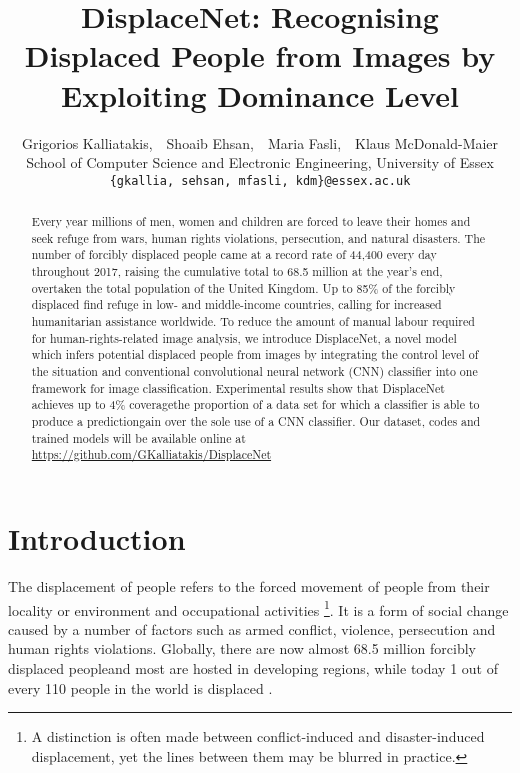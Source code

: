 \documentclass[10pt,twocolumn,letterpaper]{article}
\begin{document}
\title{DisplaceNet: Recognising Displaced People from Images by Exploiting Dominance Level}

\author{
	Grigorios Kalliatakis, \,\,
	Shoaib Ehsan, \,\,
	Maria Fasli, \,\,
	Klaus McDonald-Maier\vspace{3pt}\\
	School of Computer Science and Electronic Engineering, University of Essex\\
	{\tt\small \{gkallia, sehsan, mfasli, kdm\}@essex.ac.uk} 
}

\maketitle


\begin{abstract}
	Every year millions of men, women and children are forced to leave their homes and seek refuge from wars, human rights violations, persecution, and natural disasters. The number of forcibly displaced people came at a record rate of 44,400 every day throughout 2017, raising the cumulative total to 68.5 million at the year’s end, overtaken the total population of the United Kingdom. Up to 85\% of the forcibly displaced find refuge in low- and middle-income countries, calling for increased humanitarian assistance worldwide. To reduce the amount of manual labour required for human-rights-related image analysis, we introduce DisplaceNet, a novel model
	which infers potential displaced people from images by integrating the control level of the situation and conventional convolutional neural network (CNN) classifier into one framework for image classification. Experimental results show that DisplaceNet achieves up to 4\% coverage\textendash the proportion of a data set for which a classifier is able to produce a prediction\textendash gain over the sole use of a CNN classifier. Our dataset, codes and trained models will be available online at \url{https://github.com/GKalliatakis/DisplaceNet}
\end{abstract}

\section{Introduction}

The displacement of people refers to the forced movement of people from their locality or environment and occupational activities \footnote{A distinction is often made between conflict-induced and disaster-induced displacement, yet the lines between them may be blurred in practice.}. It is a form of social change caused by a number of factors such as armed conflict, violence, persecution and human rights violations. Globally, there are now almost 68.5 million forcibly displaced people\textendash and most are hosted in developing regions, while today 1 out of every 110 people in the world is displaced \cite{global_trends_report}.
\end{document}
